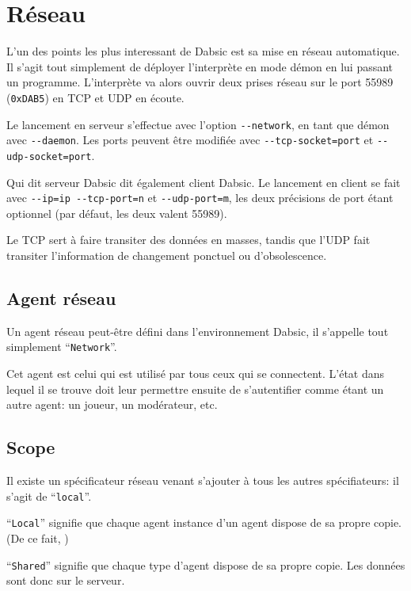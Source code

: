 \documentclass[a5paper, 12pt]{book}
\begin{document}

\chapter{Réseau}

L'un des points les plus interessant de Dabsic est sa
mise en réseau automatique. Il s'agit tout simplement
de déployer l'interprète en mode démon en lui passant
un programme. L'interprète va alors ouvrir deux prises
réseau sur le port 55989 (\verb!0xDAB5!) en TCP et UDP en écoute.

Le lancement en serveur s'effectue avec l'option \verb!--network!,
en tant que démon avec \verb!--daemon!. Les ports peuvent être
modifiée avec \verb!--tcp-socket=port! et \verb!--udp-socket=port!.

Qui dit serveur Dabsic dit également client Dabsic.
Le lancement en client se fait avec \verb!--ip=ip --tcp-port=n!
et \verb!--udp-port=m!, les deux précisions de port étant
optionnel (par défaut, les deux valent 55989).

Le TCP sert à faire transiter des données en masses,
tandis que l'UDP fait transiter l'information de
changement ponctuel ou d'obsolescence.

\section{Agent réseau}

Un agent réseau peut-être défini dans l'environnement
Dabsic, il s'appelle tout simplement ``\verb!Network!''.

Cet agent est celui qui est utilisé par tous ceux qui
se connectent. L'état dans lequel il se trouve doit
leur permettre ensuite de s'autentifier comme étant
un autre agent: un joueur, un modérateur, etc.

\section{Scope}

Il existe un spécificateur réseau venant s'ajouter
à tous les autres spécifiateurs: il s'agit de ``\verb!local!''.

``\verb!Local!'' signifie que chaque agent instance d'un agent
dispose de sa propre copie. (De ce fait, )

``\verb!Shared!'' signifie que chaque type d'agent dispose
de sa propre copie. Les données sont donc sur le serveur.
\end{document}
